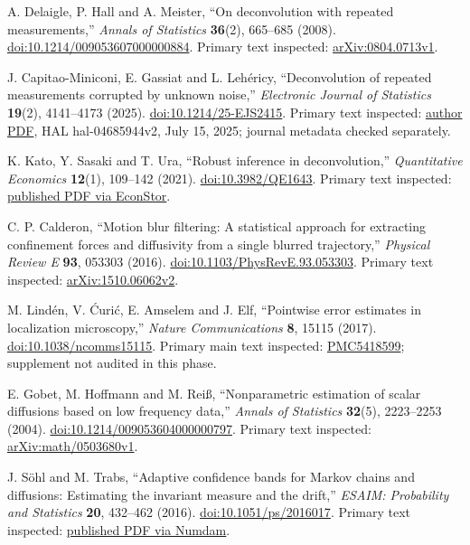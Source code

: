 A. Delaigle, P. Hall and A. Meister,
``On deconvolution with repeated measurements,''
\emph{Annals of Statistics} \textbf{36}(2), 665--685 (2008).
\href{https://doi.org/10.1214/009053607000000884}{doi:10.1214/009053607000000884}.
Primary text inspected:
\href{https://arxiv.org/abs/0804.0713v1}{arXiv:0804.0713v1}.

J. Capitao-Miniconi, E. Gassiat and L. Leh\'ericy,
``Deconvolution of repeated measurements corrupted by unknown noise,''
\emph{Electronic Journal of Statistics} \textbf{19}(2), 4141--4173 (2025).
\href{https://doi.org/10.1214/25-EJS2415}{doi:10.1214/25-EJS2415}.
Primary text inspected:
\href{https://www.imo.universite-paris-saclay.fr/~elisabeth.gassiat/repeated.pdf}{author PDF},
HAL hal-04685944v2, July 15, 2025; journal metadata checked separately.

K. Kato, Y. Sasaki and T. Ura,
``Robust inference in deconvolution,''
\emph{Quantitative Economics} \textbf{12}(1), 109--142 (2021).
\href{https://doi.org/10.3982/QE1643}{doi:10.3982/QE1643}.
Primary text inspected:
\href{https://www.econstor.eu/bitstream/10419/253609/1/qe1643.pdf}{published PDF via EconStor}.

C. P. Calderon,
``Motion blur filtering: A statistical approach for extracting confinement
forces and diffusivity from a single blurred trajectory,''
\emph{Physical Review E} \textbf{93}, 053303 (2016).
\href{https://doi.org/10.1103/PhysRevE.93.053303}{doi:10.1103/PhysRevE.93.053303}.
Primary text inspected:
\href{https://arxiv.org/abs/1510.06062v2}{arXiv:1510.06062v2}.

M. Lind\'en, V. \'Curi\'c, E. Amselem and J. Elf,
``Pointwise error estimates in localization microscopy,''
\emph{Nature Communications} \textbf{8}, 15115 (2017).
\href{https://doi.org/10.1038/ncomms15115}{doi:10.1038/ncomms15115}.
Primary main text inspected:
\href{https://pmc.ncbi.nlm.nih.gov/articles/PMC5418599/}{PMC5418599};
supplement not audited in this phase.

E. Gobet, M. Hoffmann and M. Rei\ss,
``Nonparametric estimation of scalar diffusions based on low frequency data,''
\emph{Annals of Statistics} \textbf{32}(5), 2223--2253 (2004).
\href{https://doi.org/10.1214/009053604000000797}{doi:10.1214/009053604000000797}.
Primary text inspected:
\href{https://arxiv.org/abs/math/0503680v1}{arXiv:math/0503680v1}.

J. S\"ohl and M. Trabs,
``Adaptive confidence bands for Markov chains and diffusions: Estimating the
invariant measure and the drift,''
\emph{ESAIM: Probability and Statistics} \textbf{20}, 432--462 (2016).
\href{https://doi.org/10.1051/ps/2016017}{doi:10.1051/ps/2016017}.
Primary text inspected:
\href{https://www.numdam.org/item/10.1051/ps/2016017.pdf}{published PDF via Numdam}.
